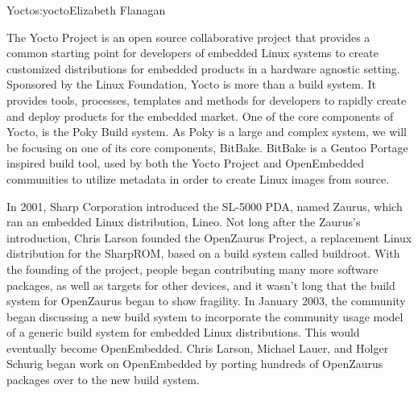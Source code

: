 \begin{aosachapter}{Yocto}{s:yocto}{Elizabeth Flanagan}


%
%

The Yocto Project\textsuperscript{\texttrademark} is an open source
collaborative project that provides a common starting point for
developers of embedded Linux systems to create customized
distributions for embedded products in a hardware agnostic
setting. Sponsored by the Linux Foundation\textsuperscript{\texttrademark}, Yocto is more than a
build system. It provides tools, processes, templates and methods for
developers to rapidly create and deploy products for the embedded
market. One of the core components of Yocto, is the Poky Build
system. As Poky is a large and complex system, we will be focusing on
one of its core components, BitBake.  BitBake is a Gentoo Portage
inspired build tool, used by both the Yocto Project and OpenEmbedded
communities to utilize metadata in order to create Linux images from
source.

In 2001, Sharp Corporation introduced the SL-5000 PDA, named Zaurus,
which ran an embedded Linux distribution, Lineo. Not long after the
Zaurus's introduction, Chris Larson founded the OpenZaurus Project, a
replacement Linux distribution for the SharpROM, based on a build
system called buildroot. With the founding of the project, people
began contributing many more software packages, as well as targets for
other devices, and it wasn't long that the build system for OpenZaurus
began to show fragility. In January 2003, the community began
discussing a new build system to incorporate the community usage model
of a generic build system for embedded Linux distributions. This would
eventually become OpenEmbedded. Chris Larson, Michael Lauer, and
Holger Schurig began work on OpenEmbedded by porting hundreds of
OpenZaurus packages over to the new build system.


\end{aosachapter}
